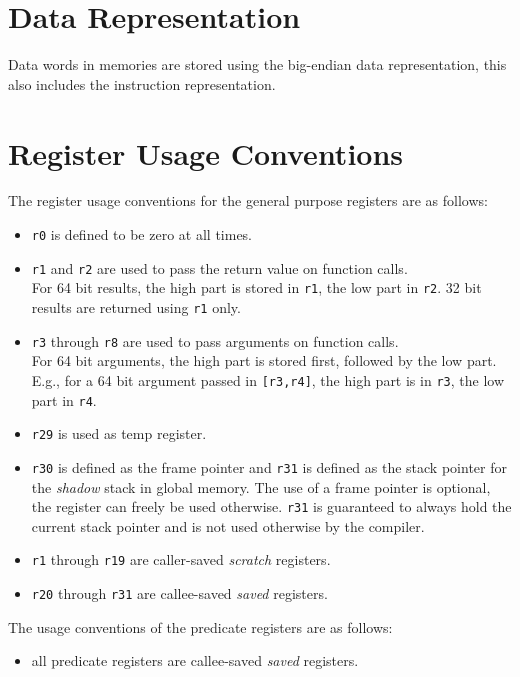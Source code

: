 \section{Data Representation}

Data words in memories are stored using the big-endian data representation, this
also includes the instruction representation.

\section{Register Usage Conventions}

The register usage conventions for the general purpose registers are as follows:
\begin{itemize}
  \item \texttt{r0} is defined to be zero at all times.
  \item \texttt{r1} and \texttt{r2} are used to pass the return value on
        function calls. \\
        For 64 bit results, the high part is stored in \texttt{r1},
        the low part in \texttt{r2}.
	32 bit results are returned using \texttt{r1} only.
  \item \texttt{r3} through \texttt{r8} are used to pass arguments on function
        calls. \\
        For 64 bit arguments, the high part is stored first,
        followed by the low part.\\ E.g., for a 64 bit argument passed in
        \texttt{[r3,r4]}, the high part is in \texttt{r3}, the low part
        in \texttt{r4}.
  \item \texttt{r29} is used as temp register.
  \item \texttt{r30} is defined as the frame pointer and
        \texttt{r31} is defined as the stack pointer for the \emph{shadow}
        stack in global memory.
        The use of a frame pointer is optional, the register can freely be
        used otherwise.
	\texttt{r31} is guaranteed to always hold the current stack pointer and
        is not used otherwise by the compiler.
  \item \texttt{r1} through \texttt{r19} are caller-saved \emph{scratch}
        registers.
  \item \texttt{r20} through \texttt{r31} are callee-saved \emph{saved}
        registers.
\end{itemize}

The usage conventions of the predicate registers are as follows:
\begin{itemize}
  \item all predicate registers are callee-saved \emph{saved} registers.
\end{itemize}



